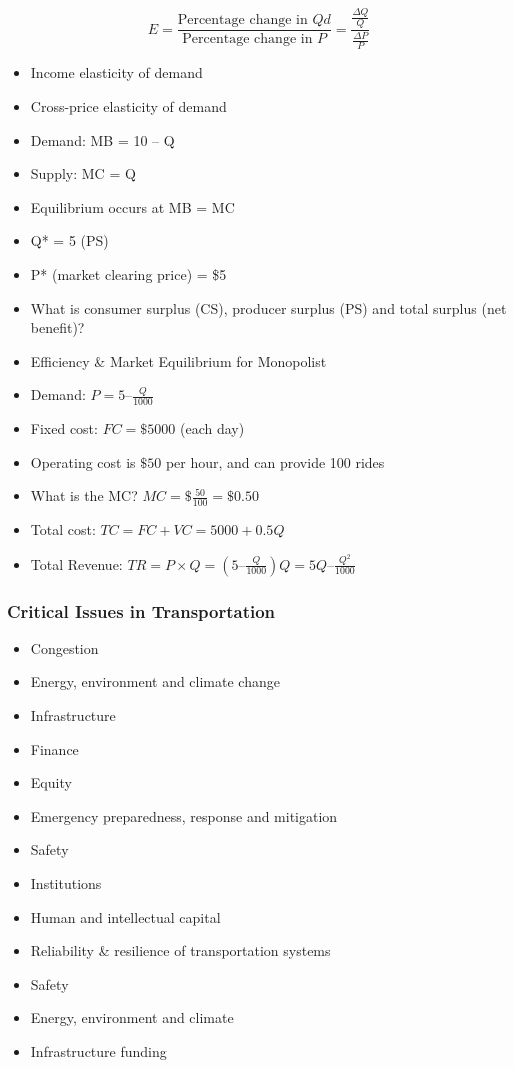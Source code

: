 \documentclass[]{article}
\providecommand{\tightlist}{%
  \setlength{\itemsep}{0pt}\setlength{\parskip}{0pt}}
\begin{document}
\[E=\frac{\text{Percentage change in }Qd}{\text{Percentage change in }P}=\frac{\frac{\Delta Q}Q}{\frac{\Delta P}P}\]

\begin{itemize}
\item
  Income elasticity of demand
\item
  Cross-price elasticity of demand
\item
  Demand: MB = 10 -- Q
\item
  Supply: MC = Q
\item
  Equilibrium occurs at MB = MC
\item
  Q* = 5 (PS)
\item
  P* (market clearing price) = \$5
\item
  What is consumer surplus (CS), producer surplus (PS) and total surplus
  (net benefit)?
\item
  Efficiency \& Market Equilibrium for Monopolist
\item
  Demand: \(P=5–\frac{Q}{1000}\)
\item
  Fixed cost: \(FC=\$5000\) (each day)
\item
  Operating cost is \(\$50\) per hour, and can provide 100 rides
\item
  What is the MC? \(MC=\$\frac{50}{100} = \$0.50\)
\item
  Total cost: \(TC=FC+VC=5000+0.5Q\)
\item
  Total Revenue:
  \(TR=P\times Q=(5–\frac{Q}{1000})Q=5Q–\frac{Q^2}{1000}\)
\end{itemize}

\hypertarget{critical-issues-in-transportation}{%
\subsubsection{Critical Issues in
Transportation}\label{critical-issues-in-transportation}}

\begin{itemize}
\tightlist
\item
  Congestion
\item
  Energy, environment and climate change
\item
  Infrastructure
\item
  Finance
\item
  Equity
\item
  Emergency preparedness, response and mitigation
\item
  Safety
\item
  Institutions
\item
  Human and intellectual capital
\item
  Reliability \& resilience of transportation systems
\item
  Safety
\item
  Energy, environment and climate
\item
  Infrastructure funding
\end{itemize}
\end{document}
